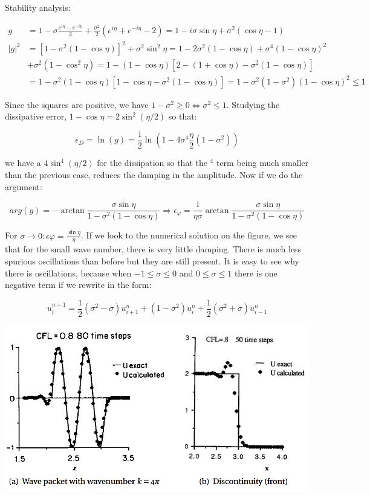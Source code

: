 Stability analysis: 

\begin{equation}
\begin{aligned}
g &= 1 - \sigma \frac{e^{i\eta} - e^{-i\eta}}{2} + \frac{\sigma ^2}{2} (e^{i\eta} + e^{-i\eta}-2) = 1 - i \sigma \sin \eta + \sigma ^2 (\cos \eta -1)\\
|g|^2 &= [1 - \sigma ^2 (1 -\cos \eta)]^2 +\sigma^2 \sin ^2 \eta = 1 - 2 \sigma ^2 (1- \cos \eta) + \sigma ^4 (1 - \cos \eta)^2 \\
&+ \sigma ^2 (1-\cos ^2\eta)= 1 - (1 -\cos \eta) [2- (1 + \cos \eta) - \sigma ^2 (1 - \cos \eta)] \\
 &= 1 - \sigma ^2 (1-\cos \eta ) [1 - \cos \eta - \sigma ^2 (1- \cos \eta)] = 1 - \sigma ^2 (1- \sigma ^2) (1 - \cos \eta )^2 \leq 1
\end{aligned}
\end{equation}

Since the squares are positive, we have $1 - \sigma ^2 \geq 0\Leftrightarrow \sigma ^2 \leq 1$. Studying the dissipative error, $1 - \cos \eta = 2\sin ^2 (\eta /2)$ so that: 

\begin{equation}
\epsilon _D = \ln(g) = \frac{1}{2}\ln (1-4\sigma ^4\frac{\eta}{2}(1-\sigma ^2))
\end{equation}

we have a $4 \sin ^4 (\eta /2)$ for the dissipation so that the $^4$ term being much smaller than the previous case, reduces the damping in the amplitude. Now if we do the argument: 

\begin{equation}
arg(g) = - \arctan \frac{\sigma \sin \eta }{1 - \sigma ^2 (1 - \cos \eta)} \Rightarrow \epsilon _\varphi = \frac{1}{\eta \sigma} \arctan \frac{\sigma \sin \eta}{1- \sigma ^2 (1- \cos \eta)}
\end{equation} 

For $\sigma \rightarrow 0: \epsilon \varphi = \frac{\sin \eta}{\eta}$. If we look to the numerical solution on the figure, we see that for the small wave number, there is very little damping. There is much less spurious oscillations than before but they are still present. It is easy to see why there is oscillations, because when $-1 \leq \sigma\leq 0$ and $0\leq \sigma \leq 1$ there is one negative term if we rewrite in the form: 

\begin{equation}
u_i^{n+1} = \frac{1}{2}(\sigma ^2 - \sigma)u^n_{i+1} + (1-\sigma ^2)u_i^{n}+ \frac{1}{2}(\sigma ^2 + \sigma) u_{i-1}^n
\end{equation}

\begin{center}
\includegraphics[scale=0.5]{ch3/13}
\end{center}
